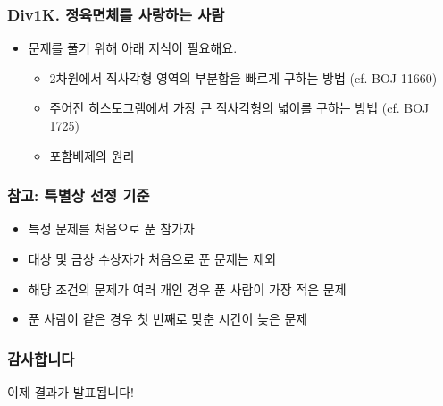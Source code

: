 \documentclass[xetex]{beamer}
\begin{document}
\begin{frame}
  \frametitle{Div1K. 정육면체를 사랑하는 사람}
  \begin{itemize}
    \item 문제를 풀기 위해 아래 지식이 필요해요.
    \begin{itemize}
      \item 2차원에서 직사각형 영역의 부분합을 빠르게 구하는 방법 (cf. BOJ 11660)
      \item 주어진 히스토그램에서 가장 큰 직사각형의 넓이를 구하는 방법 (cf. BOJ 1725)
      \item 포함배제의 원리
    \end{itemize}
  \end{itemize}
\end{frame}



\begin{frame}
  \frametitle{참고: 특별상 선정 기준}
  \begin{itemize}
    \item 특정 문제를 처음으로 푼 참가자
    \item 대상 및 금상 수상자가 처음으로 푼 문제는 제외
    \item 해당 조건의 문제가 여러 개인 경우 푼 사람이 가장 적은 문제
    \item 푼 사람이 같은 경우 첫 번째로 맞춘 시간이 늦은 문제
  \end{itemize}
\end{frame}

\begin{frame}
  \frametitle{감사합니다}
  \begin{center}
    이제 결과가 발표됩니다!
  \end{center}
\end{frame}
\end{document}

